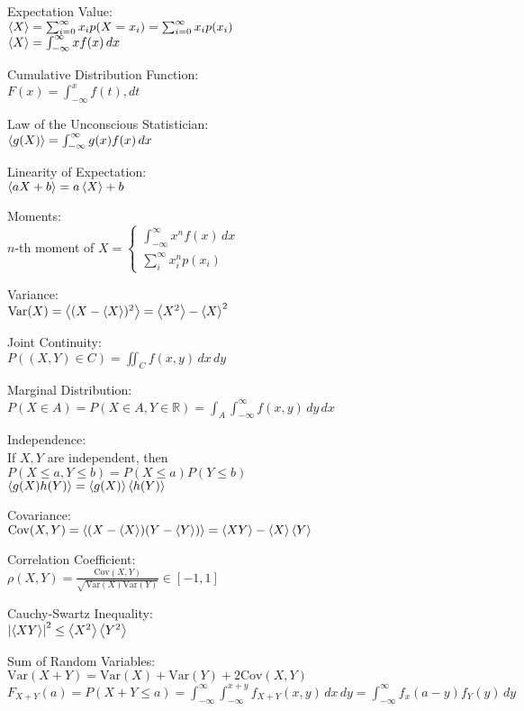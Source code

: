 \documentclass[12pt,landscape]{article}
\newcommand{\tab}{\hspace*{1em}}
\newcommand{\ds}{\displaystyle}
\newcommand{\Var}[1]{\mathrm{Var}(#1)}
\newcommand{\Cov}[1]{\mathrm{Cov}(#1)}
\theoremstyle{definition}
\begin{document}
\begin{multicols}{3}
Expectation Value:\\
\tab $\expval{X} = \sum_{i=0}^{\infty} x_i p(X = x_i) = \sum_{i=0}^{\infty} x_i p(x_i)$\\
\tab $\expval{X} = \int_{-\infty}^\infty xf(x)\,dx$

Cumulative Distribution Function:\\
\tab $F(x) = \int_{-\infty}^{x} f(t),dt$

Law of the Unconscious Statistician:\\
\tab $\expval{g(X)} = \int_{-\infty}^{\infty}g(x)f(x)\,dx$

Linearity of Expectation:\\
\tab $\expval{aX+b} = a\expval{X} + b$

Moments:\\
\tab $n$-th moment of $X = \begin{cases}
\int_{-\infty}^{\infty}x^n f(x)\,dx & \,\\
\sum_{i}^{\infty} x_i^n p(x_i) & \,
\end{cases}$

Variance:\\
\tab $\Var{X} = \expval{(X-\expval{X})^2} = \expval{X^2} - \expval{X}^2$

Joint Continuity:\\
\tab $P((X,Y)\in C) = \iint_C f(x,y)\,dx\,dy$

Marginal Distribution:\\
\tab $P(X\in A) = P(X \in A, Y \in \mathbb{R}) = \int_A \int_{-\infty}^{\infty}f(x,y)\,dy\,dx$

Independence:\\
If $X,Y$ are independent, then\\
\tab $P(X\leq a, Y\leq b) = P(X\leq a)P(Y\leq b)$\\
\tab $\expval{g(X)h(Y)} = \expval{g(X)}\expval{h(Y)}$

Covariance:\\
\tab $\Cov{X,Y} = \expval{(X-\expval{X})(Y-\expval{Y})} = \expval{XY} - \expval{X}\expval{Y}$

Correlation Coefficient:\\
\tab $\ds \rho(X,Y) = \frac{\Cov{X,Y}}{\sqrt{\Var{X}\Var{Y}}} \in [-1,1]$

Cauchy-Swartz Inequality:\\
\tab $\abs{\expval{XY}}^2 \leq \expval{X^2}\expval{Y^2}$

Sum of Random Variables:\\
\tab $\Var{X+Y} = \Var{X} + \Var{Y} + 2\Cov{X,Y}$\\
\tab $\ds F_{X+Y}(a) = P(X+Y \leq a) = \int_{-\infty}^{\infty}\int_{-\infty}^{x+y}f_{X+Y}(x,y)\,dx\,dy = \int_{-\infty}^{\infty}f_x(a-y)f_Y(y)\,dy$


\end{multicols}
\end{document}
